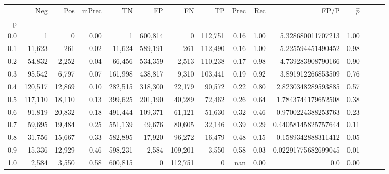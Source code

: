 \begin{tabular}{rrrrrrrrrrrrrrr}
\toprule
{} &      Neg &     Pos & mPrec &       TN &       FP &       FN &       TP &  Prec &   Rec &                 FP/P & $\hat{p}$ \\
p   &          &         &       &          &          &          &          &       &       &                      &           \\
\midrule
0.0 &        1 &       0 &  0.00 &        1 &  600,814 &        0 &  112,751 &  0.16 &  1.00 &    5.328680011707213 &      1.00 \\
0.1 &   11,623 &     261 &  0.02 &   11,624 &  589,191 &      261 &  112,490 &  0.16 &  1.00 &    5.225594451490452 &      0.98 \\
0.2 &   54,832 &   2,252 &  0.04 &   66,456 &  534,359 &    2,513 &  110,238 &  0.17 &  0.98 &    4.739283908790166 &      0.90 \\
0.3 &   95,542 &   6,797 &  0.07 &  161,998 &  438,817 &    9,310 &  103,441 &  0.19 &  0.92 &    3.891912266853509 &      0.76 \\
0.4 &  120,517 &  12,869 &  0.10 &  282,515 &  318,300 &   22,179 &   90,572 &  0.22 &  0.80 &   2.8230348289593885 &      0.57 \\
0.5 &  117,110 &  18,110 &  0.13 &  399,625 &  201,190 &   40,289 &   72,462 &  0.26 &  0.64 &   1.7843744179652508 &      0.38 \\
0.6 &   91,819 &  20,832 &  0.18 &  491,444 &  109,371 &   61,121 &   51,630 &  0.32 &  0.46 &   0.9700224388253763 &      0.23 \\
0.7 &   59,695 &  19,484 &  0.25 &  551,139 &   49,676 &   80,605 &   32,146 &  0.39 &  0.29 &  0.44058145825757644 &      0.11 \\
0.8 &   31,756 &  15,667 &  0.33 &  582,895 &   17,920 &   96,272 &   16,479 &  0.48 &  0.15 &   0.1589342888311412 &      0.05 \\
0.9 &   15,336 &  12,929 &  0.46 &  598,231 &    2,584 &  109,201 &    3,550 &  0.58 &  0.03 &  0.02291775682699045 &      0.01 \\
1.0 &    2,584 &   3,550 &  0.58 &  600,815 &        0 &  112,751 &        0 &   nan &  0.00 &                  0.0 &      0.00 \\
\bottomrule
\end{tabular}
